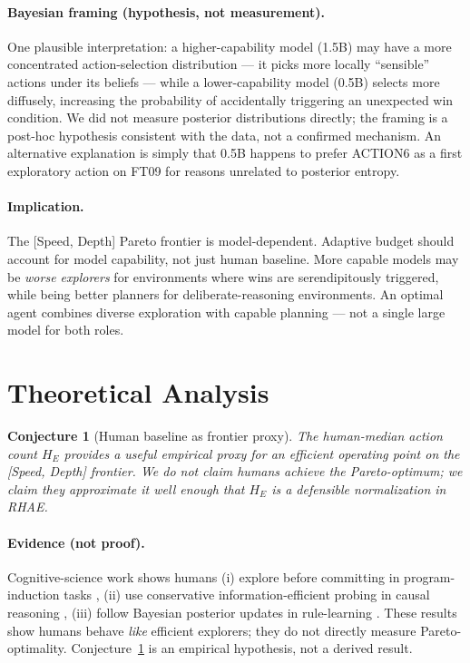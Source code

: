 \documentclass[11pt]{article}
\newtheorem{conjecture}{Conjecture}
\begin{document}
\paragraph{Bayesian framing (hypothesis, not measurement).} One plausible interpretation: a higher-capability model (1.5B) may have a more concentrated action-selection distribution --- it picks more locally ``sensible'' actions under its beliefs --- while a lower-capability model (0.5B) selects more diffusely, increasing the probability of accidentally triggering an unexpected win condition. We did not measure posterior distributions directly; the framing is a post-hoc hypothesis consistent with the data, not a confirmed mechanism. An alternative explanation is simply that 0.5B happens to prefer ACTION6 as a first exploratory action on FT09 for reasons unrelated to posterior entropy.

\paragraph{Implication.} The [Speed, Depth] Pareto frontier is model-dependent. Adaptive budget should account for model capability, not just human baseline. More capable models may be \emph{worse explorers} for environments where wins are serendipitously triggered, while being better planners for deliberate-reasoning environments. An optimal agent combines diverse exploration with capable planning --- not a single large model for both roles.

\section{Theoretical Analysis}
\label{sec:formal}

\begin{conjecture}[Human baseline as frontier proxy]
\label{conj:human-frontier}
The human-median action count $H_E$ provides a useful empirical proxy for an efficient operating point on the [Speed, Depth] frontier. We do not claim humans achieve the Pareto-optimum; we claim they approximate it well enough that $H_E$ is a defensible normalization in RHAE.
\end{conjecture}

\paragraph{Evidence (not proof).} Cognitive-science work shows humans (i) explore before committing in program-induction tasks \cite{rule2020}, (ii) use conservative information-efficient probing in causal reasoning \cite{bramley2017}, (iii) follow Bayesian posterior updates in rule-learning \cite{tenenbaum2001}. These results show humans behave \emph{like} efficient explorers; they do not directly measure Pareto-optimality. Conjecture~\ref{conj:human-frontier} is an empirical hypothesis, not a derived result.
\end{document}
